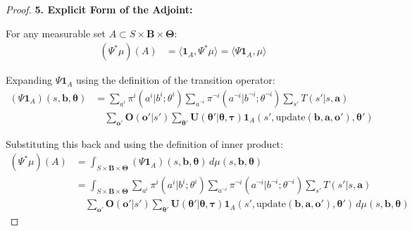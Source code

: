 \begin{proof}
    \textbf{5. Explicit Form of the Adjoint:}

    For any measurable set $A \subset S \times \boldsymbol{B}\times \boldsymbol{\Theta}$:
    \begin{align}
        (\Psi^{*}\mu)(A) & = \langle \mathbf{1}_{A}, \Psi^{*}\mu \rangle = \langle \Psi\mathbf{1}_{A}, \mu \rangle
    \end{align}

    Expanding $\Psi\mathbf{1}_{A}$ using the definition of the transition operator:
    \begin{align}
        (\Psi\mathbf{1}_{A})(s,\boldsymbol{b},\boldsymbol{\theta}) & = \sum_{a^i}\pi^{i}(a^{i}|b^{i}; \theta^{i}) \sum_{a^{\neg i}}\pi^{\neg i}(a^{\neg i}|b^{\neg i}; \theta^{\neg i}) \sum_{s'}T(s'|s, \boldsymbol{a})                                                                                                                            \\
                                                                   & \quad \sum_{\boldsymbol{o}'}\boldsymbol{O}(\boldsymbol{o}'|s') \sum_{\boldsymbol{\theta}'}\boldsymbol{U}(\boldsymbol{\theta}'|\boldsymbol{\theta}, \boldsymbol{\tau}) \mathbf{1}_{A}(s', \text{update}(\boldsymbol{b}, \boldsymbol{a}, \boldsymbol{o}'), \boldsymbol{\theta}')
    \end{align}

    Substituting this back and using the definition of inner product:
    \begin{align}
        (\Psi^{*}\mu)(A) & = \int_{S \times \boldsymbol{B} \times \boldsymbol{\Theta}}(\Psi\mathbf{1}_{A})(s,\boldsymbol{b},\boldsymbol{\theta}) \, d\mu(s, \boldsymbol{b}, \boldsymbol{\theta})                                                                                                                                                          \\
                         & = \int_{S \times \boldsymbol{B} \times \boldsymbol{\Theta}}\sum_{a^i}\pi^{i}(a^{i}|b^{i}; \theta^{i}) \sum_{a^{\neg i}}\pi^{\neg i}(a^{\neg i}|b^{\neg i}; \theta^{\neg i}) \sum_{s'}T(s'|s, \boldsymbol{a})                                                                                                                   \\
                         & \quad \sum_{\boldsymbol{o}'}\boldsymbol{O}(\boldsymbol{o}'|s') \sum_{\boldsymbol{\theta}'}\boldsymbol{U}(\boldsymbol{\theta}'|\boldsymbol{\theta}, \boldsymbol{\tau}) \mathbf{1}_{A}(s', \text{update}(\boldsymbol{b}, \boldsymbol{a}, \boldsymbol{o}'), \boldsymbol{\theta}') \, d\mu(s, \boldsymbol{b}, \boldsymbol{\theta})
    \end{align}
\end{proof}


